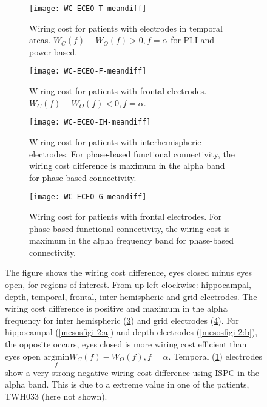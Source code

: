 \documentclass[11pt, onecolumn]{article}
\begin{document}
\begin{figure}[h]
  \begin{subfigure}[t]{0.5\linewidth}
    \centering
    \texttt{[image: WC-ECEO-T-meandiff]} 
    \caption{Wiring cost for patients with electrodes in temporal areas.  $W_C(f) - W_O(f) > 0, f = \alpha$ for PLI and power-based.} 
    \label{mesosfigi-2:c} 
  \end{subfigure} 
  \hspace{1ex}
 \begin{subfigure}[t]{0.5\linewidth}
    \centering
    \texttt{[image: WC-ECEO-F-meandiff]} 
    \caption{Wiring cost for patients with frontal electrodes. $W_C(f) - W_O(f) <0, f = \alpha$.} 
    \label{mesosfigi-2:d} 
  \end{subfigure} 
    \begin{subfigure}[t]{0.5\linewidth}
    \centering
    \texttt{[image: WC-ECEO-IH-meandiff]} 
    \caption{Wiring cost for patients with interhemispheric electrodes. For phase-based functional connectivity, the wiring cost difference is maximum in the alpha band for phase-based connectivity.} 
    \label{mesosfigi-2:e} 
  \end{subfigure}%
    \hspace{1ex}
   \begin{subfigure}[t]{0.5\linewidth}
    \centering
    \texttt{[image: WC-ECEO-G-meandiff]} 
    \caption{Wiring cost for patients with frontal electrodes. For phase-based functional connectivity, the wiring cost is maximum in the alpha frequency band for phase-based connectivity.} 
    \label{mesosfigi-2:f} 
  \end{subfigure} 
  \caption{The figure shows the wiring cost difference, eyes closed minus eyes open, for regions of interest. From up-left clockwise: hippocampal, depth, temporal, frontal, inter hemispheric and grid electrodes. The wiring cost difference is positive and maximum in the alpha frequency for inter hemispheric (\ref{mesosfigi-2:e}) and grid electrodes (\ref{mesosfigi-2:f}). For hippocampal (\ref{mesosfigi-2:a}) and depth electrodes (\ref{mesosfigi-2:b}), the opposite occurs, eyes closed is more wiring cost efficient than eyes open $\underset{f}{\mathrm{argmin}}W_C(f) - W_O(f), f =\alpha$. Temporal (\ref{mesosfigi-2:c}) electrodes show a very strong negative wiring cost difference using ISPC in the alpha band. This is due to a extreme value in one of the patients, TWH033 (here not shown).}
  \label{fig:mesosfigi-2} 
\end{figure}
\end{document}
